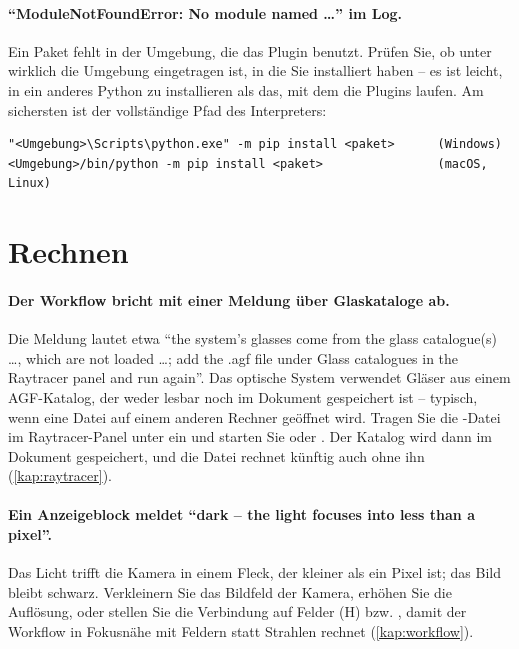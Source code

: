 \paragraph{\enquote{ModuleNotFoundError: No module named \dots} im Log.}
Ein Paket fehlt in der Umgebung, die das Plugin benutzt. Prüfen Sie, ob unter
 wirklich die Umgebung eingetragen ist, in die Sie installiert
haben -- es ist leicht, in ein anderes Python zu installieren als das, mit dem die Plugins
laufen. Am sichersten ist der vollständige Pfad des Interpreters:
\begin{lstlisting}
"<Umgebung>\Scripts\python.exe" -m pip install <paket>      (Windows)
<Umgebung>/bin/python -m pip install <paket>                (macOS, Linux)
\end{lstlisting}

\section{Rechnen}

\paragraph{Der Workflow bricht mit einer Meldung über Glaskataloge ab.}
Die Meldung lautet etwa \enquote{the system's glasses come from the glass catalogue(s) \dots,
which are not loaded \dots; add the .agf file under Glass catalogues in the Raytracer panel and
run again}. Das optische System verwendet Gläser aus einem AGF-Katalog, der weder lesbar noch
im Dokument gespeichert ist -- typisch, wenn eine Datei auf einem anderen Rechner geöffnet
wird. Tragen Sie die -Datei im Raytracer-Panel unter  ein und
starten Sie  oder . Der Katalog wird dann im Dokument
gespeichert, und die Datei rechnet künftig auch ohne ihn (\autoref{kap:raytracer}).

\paragraph{Ein Anzeigeblock meldet \enquote{dark -- the light focuses into less than a pixel}.}
Das Licht trifft die Kamera in einem Fleck, der kleiner als ein Pixel ist; das Bild bleibt
schwarz. Verkleinern Sie das Bildfeld der Kamera, erhöhen Sie die Auflösung, oder stellen
Sie die Verbindung auf Felder (H) bzw. , damit der Workflow in Fokusnähe mit
Feldern statt Strahlen rechnet (\autoref{kap:workflow}).

